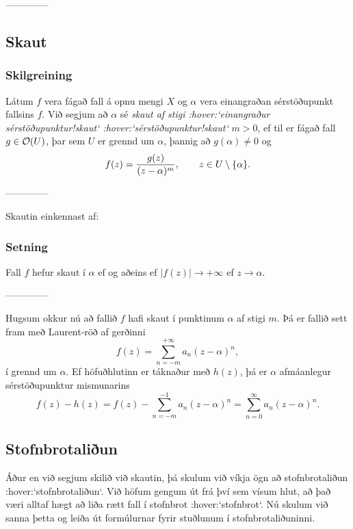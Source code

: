 --------------




\subsection*{Skaut}

\subsubsection{Skilgreining}  Látum $f$ vera fágað fall á opnu mengi $X$ og $\alpha$ vera
einangraðan sérstöðupunkt fallsins $f$. 
Við segjum að $\alpha$ sé {\it skaut af stigi :hover:`einangraður
sérstöðupunktur!skaut` :hover:`sérstöðupunktur!skaut`}
$m>0$, ef til er fágað fall $g\in {\cal O}(U)$, þar sem $U$ er grennd um
$\alpha$, þannig að $g(\alpha)\neq 0$ og 
 $$f(z)=\dfrac{g(z)}{(z-\alpha)\sp m}, \qquad z\in U\setminus{\{\alpha\}}.
 $$


--------------



Skautin einkennast af:


\subsubsection{Setning} Fall $f$ hefur skaut í $\alpha$ ef og aðeins ef
$|f(z)|\to +\infty$ ef $z\to \alpha$.

{}


--------------



Hugsum okkur nú að fallið $f$  hafi skaut í punktinum $\alpha$
af stigi $m$. Þá er fallið sett fram með Laurent-röð af gerðinni
 $$f(z)=\sum\limits_{n=-m}^{+\infty} a_n(z-\alpha)^n,
 $$
í grennd um $\alpha$.  Ef höfuðhlutinn er táknaður með $h(z)$, þá er
$\alpha$ afmáanlegur sérstöðupunktur mismunarins
 $$f(z)-h(z) =f(z)-\sum\limits_{n=-m}^{-1} a_n(z-\alpha)^n 
= \sum\limits_{n=0}^\infty a_n(z-\alpha)^n. 
 $$


\subsection*{Stofnbrotaliðun}

{Á}ður en við segjum skilið við skautin, þá skulum við víkja ögn að
stofnbrotaliðun :hover:`stofnbrotaliðun`.  Við höfum gengum út frá
því sem vísum hlut, að það væri alltaf hægt að liða rætt fall í
stofnbrot :hover:`stofnbrot`. Nú skulum við sanna þetta og leiða út
formúlurnar fyrir stuðlunum í stofnbrotaliðuninni.

